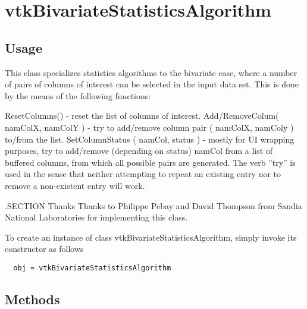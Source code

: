 \section{vtkBivariateStatisticsAlgorithm}

\subsection{Usage}

 This class specializes statistics algorithms to the bivariate case, where
 a number of pairs of columns of interest can be selected in the input data set.
 This is done by the means of the following functions:

 ResetColumns() - reset the list of columns of interest.
 Add/RemoveColum( namColX, namColY ) - try to add/remove column pair ( namColX,
 namColy ) to/from the list.
 SetColumnStatus ( namCol, status ) - mostly for UI wrapping purposes, try to 
 add/remove (depending on status) namCol from a list of buffered columns, from
 which all possible pairs are generated.
 The verb ''try'' is used in the sense that neither attempting to 
 repeat an existing entry nor to remove a non-existent entry will work.
 
 .SECTION Thanks
 Thanks to Philippe Pebay and David Thompson from Sandia National Laboratories 
 for implementing this class.

To create an instance of class vtkBivariateStatisticsAlgorithm, simply
invoke its constructor as follows
\begin{verbatim}
  obj = vtkBivariateStatisticsAlgorithm
\end{verbatim}
\subsection{Methods}

